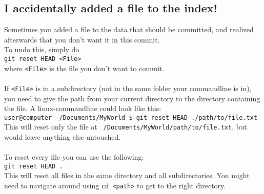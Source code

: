 \documentclass[a4paper]{article}
\begin{document}
\subsection{I accidentally added a file to the index!}
	Sometimes you added a file to the data that should be committed, and realized afterwards that you don't want it in this commit.
\\	To undo this, simply do
\\	\texttt{git reset HEAD <File>}  
\\	where \texttt{<File>} is the file you don't want to commit.
\\
\\	If \texttt{<File>} is in a subdirectory (not in the same folder your commandline is in), you need to give the path from your current directory to the directory containing the file. A linux-commandline could look like this:
\\	\texttt{user@computer ~/Documents/MyWorld \$ git reset HEAD ./path/to/file.txt}  
\\	This will reset only the file at \texttt{~/Documents/MyWorld/path/to/file.txt}, but would leave anything else untouched.  
\\
\\	To reset every file you can use the following:  
\\	\texttt{git reset HEAD .}  
\\	This will reset all files in the same directory and all subdirectories. You might need to navigate around using \texttt{cd <path>} to get to the right directory.
\end{document}
